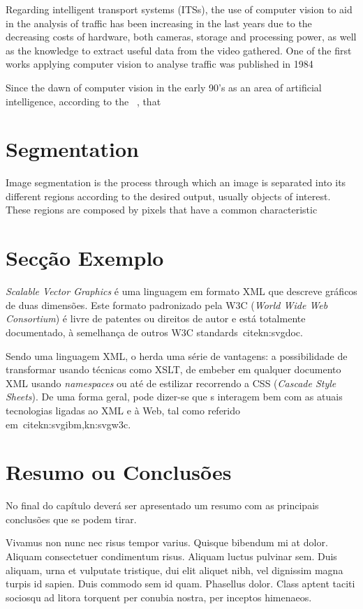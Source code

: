 Regarding intelligent transport systems (ITSs), the use of computer vision to aid in the analysis of traffic has been increasing in the last years due to the decreasing costs of hardware, both cameras, storage and processing power, as well as the knowledge to extract useful data from the video gathered. One of the first works applying computer vision to analyse traffic was published in 1984 ~\cite{dickinson_image_1984}

Since the dawn of computer vision in the early 90's as an area of artificial intelligence, according to the  ~\cite{acm_2012_2012}, that 

\section{Segmentation}
Image segmentation is the process through which  an image is separated into its different regions according to the desired output, usually objects of interest. These regions are composed by pixels that have a common characteristic~\cite{shapiro_computer_2001}


\section{Secção Exemplo}\label{sec:dialecto}

\emph{Scalable Vector Graphics} é uma
linguagem em formato XML que descreve gráficos de duas dimensões. 
Este formato padronizado pela W3C (\emph{World Wide Web Consortium})
é livre de patentes ou direitos de autor e está totalmente
documentado, à semelhança de outros W3C
standards~cite{kn:svgdoc}.

Sendo uma linguagem XML, o \svg{} herda uma série de vantagens: a
possibilidade de transformar \svg{} usando técnicas como
XSLT, de embeber \svg{} em qualquer documento
XML usando \textit{namespaces} ou até de  
estilizar \svg{} recorrendo a CSS (\emph{Cascade Style Sheets}). 
De uma forma geral, pode dizer-se que \svg{}s interagem bem com as
atuais tecnologias ligadas ao XML e à Web, tal como referido
em~cite{kn:svgibm,kn:svgw3c}.

\section{Resumo ou Conclusões}

No final do capítulo deverá ser apresentado um resumo com as 
principais conclusões que se podem tirar. 

Vivamus non nunc nec risus tempor varius. Quisque bibendum mi at
dolor. Aliquam consectetuer condimentum risus. Aliquam luctus pulvinar
sem. Duis aliquam, urna et vulputate tristique, dui elit aliquet nibh,
vel dignissim magna turpis id sapien. Duis commodo sem id
quam. Phasellus dolor. Class aptent taciti sociosqu ad litora torquent
per conubia nostra, per inceptos himenaeos. 
